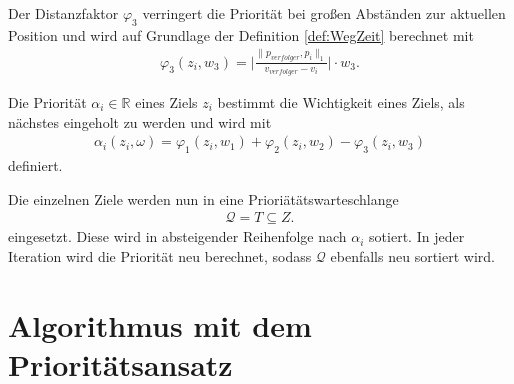 \documentclass[german,version-2019-11]{uzl-thesis}
\begin{document}
Der Distanzfaktor $\varphi_3$ verringert die Priorität bei großen Abständen zur aktuellen Position und wird auf Grundlage der Definition \ref{def:WegZeit} berechnet mit
\begin{align}
\varphi_3(z_i, w_3) = \bigg\vert\frac{\|p_{verfolger},p_i\|_1}{v_{verfolger}-v_i}\bigg\vert \cdot w_3.
\end{align}
\begin{definition}
Die Priorität $\alpha_i\in\mathbb{R}$ eines Ziels $z_i$ bestimmt die Wichtigkeit eines Ziels, als nächstes eingeholt zu werden und wird mit
\begin{align*}
\alpha_i(z_i, \omega) = \varphi_1(z_i,w_1) + \varphi_2(z_i,w_2) - \varphi_3(z_i,w_3)
\end{align*}
definiert.
\end{definition}\noindent
Die einzelnen Ziele werden nun in eine Prioriätätswarteschlange
\begin{align*}
\mathcal{Q} = T\subseteq Z.
\end{align*}
eingesetzt. Diese wird in absteigender Reihenfolge nach $\alpha_i$ sotiert. In jeder Iteration wird die Priorität neu berechnet, sodass $\mathcal{Q}$ ebenfalls neu sortiert wird.

\section{Algorithmus mit dem Prioritätsansatz}
\end{document}
